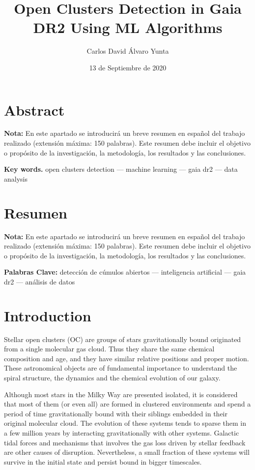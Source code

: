 \documentclass[11pt, a4paper, english]{book}
\title{Open Clusters Detection in Gaia DR2 Using ML Algorithms}
\author{Carlos David Álvaro Yunta}
\date{13 de Septiembre de 2020}
\begin{document}

\maketitle

\frontmatter
\tableofcontents
\listoffigures
\listoftables

\chapter{Abstract}
{\bf Nota:} En este apartado se introducirá un breve resumen en español del trabajo realizado (extensión máxima: 150 palabras). Este resumen debe incluir el objetivo o propósito de la investigación, la metodología, los resultados y las conclusiones.


{\bf Key words.} open clusters detection --- machine learning --- gaia dr2 --- data analysis

\chapter{Resumen}
{\bf Nota:} En este apartado se introducirá un breve resumen en español del trabajo realizado (extensión máxima: 150 palabras). Este resumen debe incluir el objetivo o propósito de la investigación, la metodología, los resultados y las conclusiones.


{\bf Palabras Clave:} detección de cúmulos abiertos --- inteligencia artificial --- gaia dr2 --- análisis de datos

\mainmatter
\chapter{Introduction}

Stellar open clusters (OC) are groups of stars gravitationally bound originated from a single molecular gas cloud.
Thus they share the same chemical composition and age, and they have similar relative positions and proper motion.
These astronomical objects are of fundamental importance to understand the spiral structure,
the dynamics and the chemical evolution of our galaxy.

Although most stars in the Milky Way are presented isolated, it is considered that most of them (or even all)
are formed in clustered environments and spend a period of time gravitationally bound with their siblings embedded
in their original molecular cloud.
\cite[Clarke et al. 2000]{clarke2000theformationofstellarclusters} \cite[Portegies Zwart et al. 2010]{portegies2010young}
The evolution of these systems tends to sparse them in a few million years by interacting gravitationally with other systems.
Galactic tidal forces and mechanisms that involves the gas loss driven by stellar feedback are other causes of disruption.
\cite[Brinkmann et al. 2017]{brinkmann2017bound}
Nevertheless, a small fraction of these systems will survive in the initial state and persist bound in bigger timescales.
\end{document}
